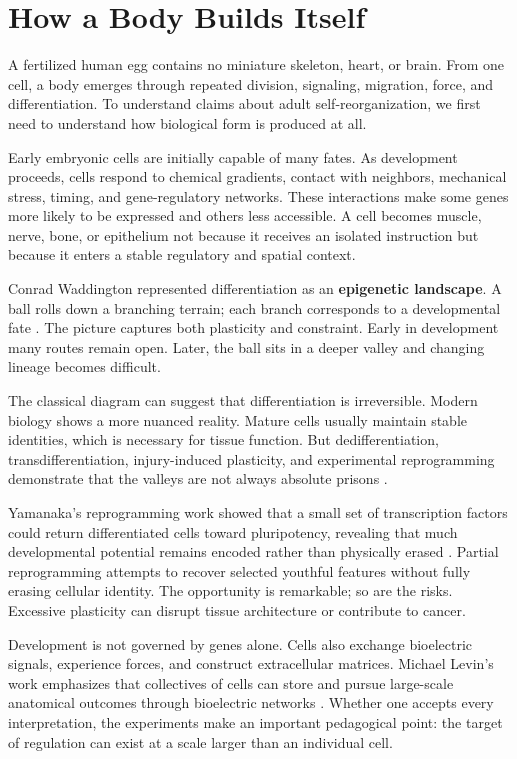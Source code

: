 \chapter{How a Body Builds Itself}\label{chapter-5-how-a-body-builds-itself}

A fertilized human egg contains no miniature skeleton, heart, or brain. From one cell, a body emerges through repeated division, signaling, migration, force, and differentiation. To understand claims about adult self-reorganization, we first need to understand how biological form is produced at all.

Early embryonic cells are initially capable of many fates. As development proceeds, cells respond to chemical gradients, contact with neighbors, mechanical stress, timing, and gene-regulatory networks. These interactions make some genes more likely to be expressed and others less accessible. A cell becomes muscle, nerve, bone, or epithelium not because it receives an isolated instruction but because it enters a stable regulatory and spatial context.

Conrad Waddington represented differentiation as an \textbf{epigenetic landscape}. A ball rolls down a branching terrain; each branch corresponds to a developmental fate \autocite{waddington1957strategy}. The picture captures both plasticity and constraint. Early in development many routes remain open. Later, the ball sits in a deeper valley and changing lineage becomes difficult.

The classical diagram can suggest that differentiation is irreversible. Modern biology shows a more nuanced reality. Mature cells usually maintain stable identities, which is necessary for tissue function. But dedifferentiation, transdifferentiation, injury-induced plasticity, and experimental reprogramming demonstrate that the valleys are not always absolute prisons \autocite{merrell2016plasticity,tata2016cellular}.

Yamanaka's reprogramming work showed that a small set of transcription factors could return differentiated cells toward pluripotency, revealing that much developmental potential remains encoded rather than physically erased \autocite{yamanaka2010nuclear}. Partial reprogramming attempts to recover selected youthful features without fully erasing cellular identity. The opportunity is remarkable; so are the risks. Excessive plasticity can disrupt tissue architecture or contribute to cancer.

Development is not governed by genes alone. Cells also exchange bioelectric signals, experience forces, and construct extracellular matrices. Michael Levin's work emphasizes that collectives of cells can store and pursue large-scale anatomical outcomes through bioelectric networks \autocite{levin2021bioelectric}. Whether one accepts every interpretation, the experiments make an important pedagogical point: the target of regulation can exist at a scale larger than an individual cell.

